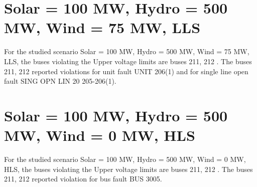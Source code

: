\documentclass[10pt]{report}
\begin{document}
\section{Solar = 100 MW, Hydro = 500 MW, Wind = 75 MW, LLS}

For the studied scenario Solar = 100 MW, Hydro = 500 MW, Wind = 75 MW, LLS, the buses violating the Upper voltage limits are buses 211, 212 .
The buses 211, 212 reported violations for unit fault UNIT 206(1) and for single line open fault SING OPN LIN   20 205-206(1).
\begin{table}[H]
\caption{Contingencies reporting bus voltages greater than emergency voltage of 1.1 PU for scenario Solar = 100 MW, Hydro = 500 MW, Wind = 75 MW, LLS}
\label{HVSolar100MWHydro500MWWind75MWLLS}
\centering
{}
\end{table}

\section{Solar = 100 MW, Hydro = 500 MW, Wind = 0 MW, HLS}

For the studied scenario Solar = 100 MW, Hydro = 500 MW, Wind = 0 MW, HLS, the buses violating the Upper voltage limits are buses 211, 212 .
The buses 211, 212 reported violation for bus fault BUS 3005.
\begin{table}[H]
\caption{Contingencies reporting bus voltages greater than emergency voltage of 1.1 PU for scenario Solar = 100 MW, Hydro = 500 MW, Wind = 0 MW, HLS}
\label{HVSolar100MWHydro500MWWind0MWHLS}
\centering
{}
\end{table}
\end{document}
